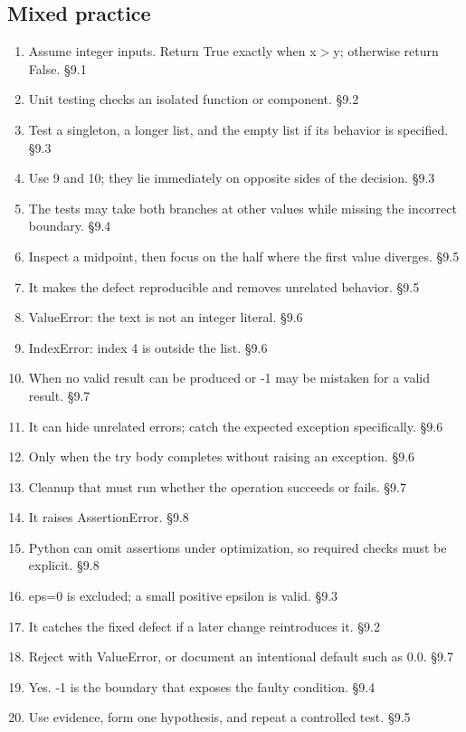 \documentclass[11pt]{article}
\begin{document}
\begin{keepsection}\subsection{Mixed practice}

\begin{enumerate}
\item Assume integer inputs. Return True exactly when x\ensuremath{>}y; otherwise return False. \hfill{\small\color{FAUblue}§9.1}
\item Unit testing checks an isolated function or component. \hfill{\small\color{FAUblue}§9.2}
\item Test a singleton, a longer list, and the empty list if its behavior is specified. \hfill{\small\color{FAUblue}§9.3}
\item Use 9 and 10; they lie immediately on opposite sides of the decision. \hfill{\small\color{FAUblue}§9.3}
\item The tests may take both branches at other values while missing the incorrect boundary. \hfill{\small\color{FAUblue}§9.4}
\item Inspect a midpoint, then focus on the half where the first value diverges. \hfill{\small\color{FAUblue}§9.5}
\item It makes the defect reproducible and removes unrelated behavior. \hfill{\small\color{FAUblue}§9.5}
\item ValueError: the text is not an integer literal. \hfill{\small\color{FAUblue}§9.6}
\item IndexError: index 4 is outside the list. \hfill{\small\color{FAUblue}§9.6}
\item When no valid result can be produced or -1 may be mistaken for a valid result. \hfill{\small\color{FAUblue}§9.7}
\item It can hide unrelated errors; catch the expected exception specifically. \hfill{\small\color{FAUblue}§9.6}
\item Only when the try body completes without raising an exception. \hfill{\small\color{FAUblue}§9.6}
\item Cleanup that must run whether the operation succeeds or fails. \hfill{\small\color{FAUblue}§9.7}
\item It raises AssertionError. \hfill{\small\color{FAUblue}§9.8}
\item Python can omit assertions under optimization, so required checks must be explicit. \hfill{\small\color{FAUblue}§9.8}
\item eps=0 is excluded; a small positive epsilon is valid. \hfill{\small\color{FAUblue}§9.3}
\item It catches the fixed defect if a later change reintroduces it. \hfill{\small\color{FAUblue}§9.2}
\item Reject with ValueError, or document an intentional default such as 0.0. \hfill{\small\color{FAUblue}§9.7}
\item Yes. -1 is the boundary that exposes the faulty condition. \hfill{\small\color{FAUblue}§9.4}
\item Use evidence, form one hypothesis, and repeat a controlled test. \hfill{\small\color{FAUblue}§9.5}
\end{enumerate}


\end{keepsection}
\end{document}
